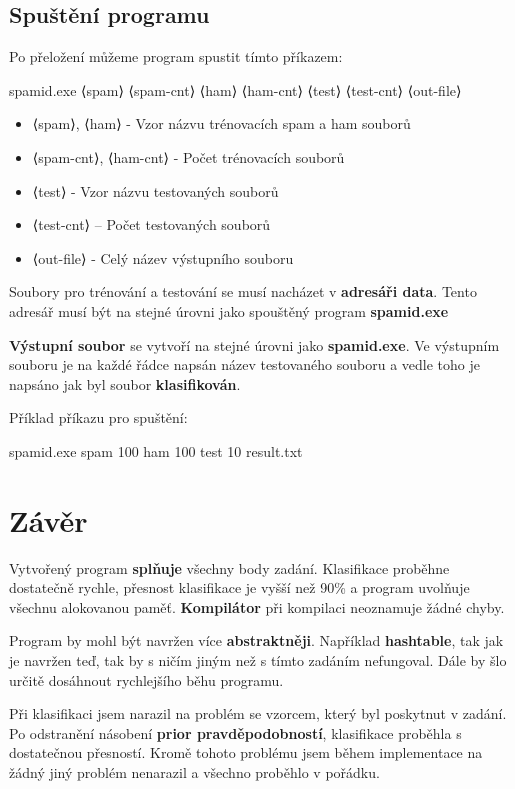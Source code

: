 \documentclass[12pt]{report}
\newcommand\myindent[1]{						
	\setlength\parindent{5mm}
	#1
	\setlength\parindent{0mm}
}
\begin{document}
		\section{Spuštění programu}
		
			Po přeložení můžeme program spustit tímto příkazem:
			
			\myindent{spamid.exe ⟨spam⟩ ⟨spam-cnt⟩ ⟨ham⟩ ⟨ham-cnt⟩ ⟨test⟩ ⟨test-cnt⟩ ⟨out-file⟩}
			
			\begin{itemize}
				\item ⟨spam⟩, ⟨ham⟩ - Vzor názvu trénovacích spam a ham souborů
				\item ⟨spam-cnt⟩, ⟨ham-cnt⟩ - Počet trénovacích souborů
				\item ⟨test⟩ - Vzor názvu testovaných souborů
				\item ⟨test-cnt⟩ – Počet testovaných souborů
				\item ⟨out-file⟩ - Celý název výstupního souboru
			\end{itemize}
		
			Soubory pro trénování a testování se musí nacházet v \textbf{adresáři data}. Tento adresář musí být na stejné úrovni jako spouštěný program \textbf{spamid.exe}
			
			\textbf{Výstupní soubor} se vytvoří na stejné úrovni jako \textbf{spamid.exe}. Ve výstupním souboru je na každé řádce napsán název testovaného souboru a vedle toho je napsáno jak byl soubor \textbf{klasifikován}.
			
			Příklad příkazu pro spuštění:
			
			\myindent{spamid.exe spam 100 ham 100 test 10 result.txt}
			
			
	\chapter{Závěr}
	
	Vytvořený program \textbf{splňuje} všechny body zadání. Klasifikace proběhne dostatečně rychle, přesnost klasifikace je vyšší než 90\% a program uvolňuje všechnu alokovanou paměť. \textbf{Kompilátor} při kompilaci neoznamuje žádné chyby.
	
	Program by mohl být navržen více \textbf{abstraktněji}. Například \textbf{hashtable}, tak jak je navržen teď, tak by s ničím jiným než s tímto zadáním nefungoval. Dále by šlo určitě dosáhnout rychlejšího běhu programu.
	
	Při klasifikaci jsem narazil na problém se vzorcem, který byl poskytnut v zadání. Po odstranění násobení \textbf{prior pravděpodobností}, klasifikace proběhla s dostatečnou přesností.
	Kromě tohoto problému jsem během implementace na žádný jiný problém nenarazil a všechno proběhlo v pořádku.
	
\end{document}
